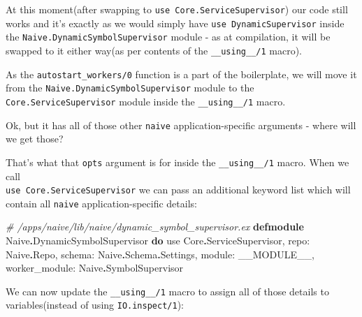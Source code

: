 \documentclass[
  oneside]{book}
\newenvironment{Shaded}{\begin{snugshade}}{\end{snugshade}}
\newcommand{\CommentTok}[1]{\textcolor[rgb]{0.56,0.35,0.01}{\textit{#1}}}
\newcommand{\ConstantTok}[1]{\textcolor[rgb]{0.56,0.35,0.01}{#1}}
\newcommand{\ImportTok}[1]{#1}
\newcommand{\KeywordTok}[1]{\textcolor[rgb]{0.13,0.29,0.53}{\textbf{#1}}}
\newcommand{\NormalTok}[1]{#1}
\newcommand{\OperatorTok}[1]{\textcolor[rgb]{0.81,0.36,0.00}{\textbf{#1}}}
\newcommand{\VariableTok}[1]{\textcolor[rgb]{0.00,0.00,0.00}{#1}}
\begin{document}
At this moment(after swapping to \texttt{use\ Core.ServiceSupervisor}) our code still works and it's exactly as we would simply have \texttt{use\ DynamicSupervisor} inside the \texttt{Naive.DynamicSymbolSupervisor} module - as at compilation, it will be swapped to it either way(as per contents of the \texttt{\_\_using\_\_/1} macro).

As the \texttt{autostart\_workers/0} function is a part of the boilerplate, we will move it from the \texttt{Naive.DynamicSymbolSupervisor} module to the \texttt{Core.ServiceSupervisor} module inside the \texttt{\_\_using\_\_/1} macro.

Ok, but it has all of those other \texttt{naive} application-specific arguments - where will we get those?

\newpage

That's what that \texttt{opts} argument is for inside the \texttt{\_\_using\_\_/1} macro. When we call\\
\texttt{use\ Core.ServiceSupervisor} we can pass an additional keyword list which will contain all \texttt{naive} application-specific details:

\begin{Shaded}
\begin{Highlighting}[]
\CommentTok{\# /apps/naive/lib/naive/dynamic\_symbol\_supervisor.ex}
\KeywordTok{defmodule} \ConstantTok{Naive}\OperatorTok{.}\ConstantTok{DynamicSymbolSupervisor} \KeywordTok{do}
  \ImportTok{use} \ConstantTok{Core}\OperatorTok{.}\ConstantTok{ServiceSupervisor}\NormalTok{,}
    \VariableTok{repo:} \ConstantTok{Naive}\OperatorTok{.}\ConstantTok{Repo}\NormalTok{,}
    \VariableTok{schema:} \ConstantTok{Naive}\OperatorTok{.}\ConstantTok{Schema}\OperatorTok{.}\ConstantTok{Settings}\NormalTok{,}
    \VariableTok{module:} \ConstantTok{\_\_MODULE\_\_}\NormalTok{,}
    \VariableTok{worker\_module:} \ConstantTok{Naive}\OperatorTok{.}\ConstantTok{SymbolSupervisor}
\end{Highlighting}
\end{Shaded}

We can now update the \texttt{\_\_using\_\_/1} macro to assign all of those details to variables(instead of using \texttt{IO.inspect/1}):
\end{document}

